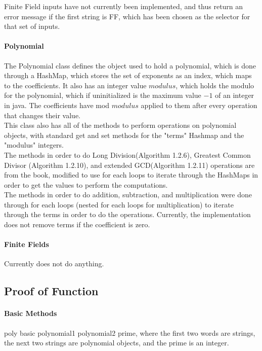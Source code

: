 \documentclass[
10pt, %
a4paper, %
oneside, %
headinclude,footinclude, %
BCOR5mm, %
]{scrartcl}
\begin{document}
Finite Field inputs have not currently been implemented, and thus return an error message if the first string is FF, which has been chosen as the selector for that set of inputs.\\


\paragraph{Polynomial}
The Polynomial class defines the object used to hold a polynomial, which is done through a HashMap, which stores the set of exponents as an index, which maps to the coefficients. It also has an integer value $modulus$, which holds the modulo for the polynomial, which if uninitialized is the maximum value $-1$ of an integer in java. The coefficients have mod $modulus$ applied to them after every operation that changes their value.\\

This class also has all of the methods to perform operations on polynomial objects, with standard get and set methods for the "terms" Hashmap and the "modulus" integers.\\

The methods in order to do Long Division(Algorithm 1.2.6), Greatest Common Divisor (Algorithm 1.2.10), and extended GCD(Algorithm 1.2.11) operations are from the book, modified to use for each loops to iterate through the HashMaps in order to get the values to perform the computations.\\

The methods in order to do addition, subtraction, and multiplication were done through for each loops (nested for each loops for multiplication) to iterate through the terms in order to do the operations. Currently, the implementation does not remove terms if the coefficient is zero.\\

\paragraph{Finite Fields}
Currently does not do anything.

\subsection{Proof of Function}
\paragraph{Basic Methods}
poly basic polynomial1 polynomial2 prime, where the first two words are strings, the next two strings are polynomial objects, and the prime is an integer.
\end{document}
